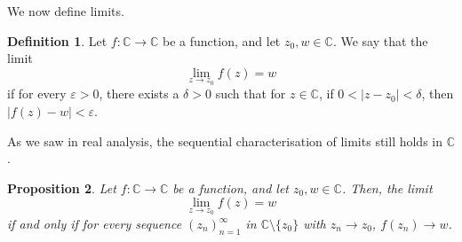 \documentclass[a4paper, openany]{memoir}
\theoremstyle{definition}
\newtheorem{definition}{Definition}[section]
\theoremstyle{plain}
\newtheorem{proposition}[definition]{Proposition}
\begin{document}
We now define limits.
\begin{definition}
Let $f: \mathbb{C} \to \mathbb{C}$ be a function, and let $z_0, w \in \mathbb{C}$. We say that the limit
\[\lim_{z \to z_0} f(z) = w\]
if for every $\varepsilon > 0$, there exists a $\delta > 0$ such that for $z \in \mathbb{C}$, if $0 < |z - z_0| < \delta$, then $|f(z) - w| < \varepsilon$.
\end{definition}
\noindent As we saw in real analysis, the sequential characterisation of limits still holds in $\mathbb{C}$.
\begin{proposition}
Let $f: \mathbb{C} \to \mathbb{C}$ be a function, and let $z_0, w \in \mathbb{C}$. Then, the limit 
\[\lim_{z \to z_0} f(z) = w\]
if and only if for every sequence $(z_n)_{n=1}^{\infty}$ in $\mathbb{C} \setminus \{z_0\}$ with $z_n \to z_0$, $f(z_n) \to w$.
\end{proposition}
    
\end{document}
